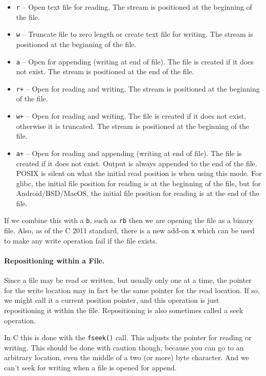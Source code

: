 \begin{itemize}
	\item \texttt{r} -- Open text file for reading. The stream is positioned at the beginning of the file.
	\item \texttt{w} -- Truncate file to zero length or create text file for writing. The stream is positioned at the beginning of the file.
	\item \texttt{a} -- Open for appending (writing at end of file). The file is created if it does not exist. The stream is positioned at the end of the file.
	\item \texttt{r+} -- Open for reading and writing. The stream is positioned at the beginning of the file.
	\item \texttt{w+} -- Open for reading and writing. The file is created if it does not exist, otherwise it is truncated. The stream is positioned at the beginning of the file.
	\item \texttt{a+} -- Open for reading and appending (writing at end of file). The file is created if it does not exist. Output is always appended to the end of the file. POSIX is silent on what the initial read position is when using this mode. For glibc, the initial file position for reading is at the beginning of the file, but for Android/BSD/MacOS, the initial file position for reading is at the end of the file.
\end{itemize}

If we combine this with a \texttt{b}, such as \texttt{rb} then we are opening the file as a binary file. Also, as of the C 2011 standard, there is a new add-on \texttt{x} which can be used to make any write operation fail if the file exists.

\paragraph{Repositioning within a File.} Since a file may be read or written, but usually only one at a time, the pointer for the write location may in fact be the same pointer for the read location. If so, we might call it a current position pointer, and this operation is just repositioning it within the file. Repositioning is also sometimes called a seek operation.

In C this is done with the \texttt{fseek()} call. This adjusts the pointer for reading or writing. This should be done with caution though, because you can go to an arbitrary location, even the middle of a two (or more) byte character. And we can't seek for writing when a file is opened for append.

